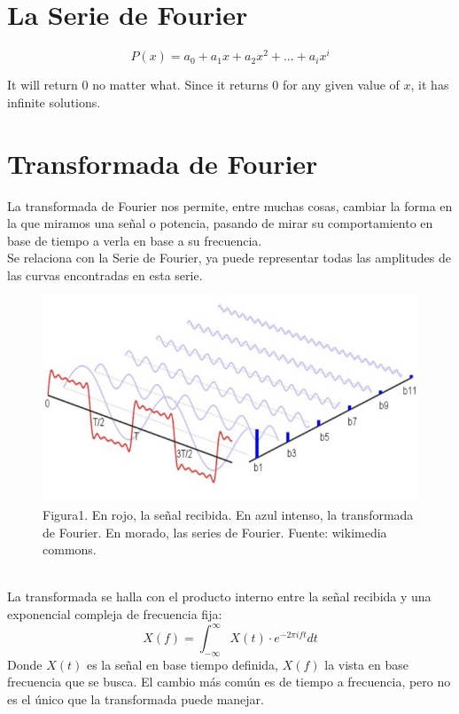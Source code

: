 \documentclass[review,1p]{elsarticle}
\begin{document}

\section{La Serie de Fourier}

\[
    P(x) = a_0 + a_1x + a_2x^2 + ...  + a_ix^i
\]

It will return 0 no matter what. Since it returns 0 for any given value of $x$, it has infinite solutions.\cite{1137202}
\label{S:1}

\section{Transformada de Fourier}
La transformada de Fourier nos permite, entre muchas cosas, cambiar la forma en 
la que miramos una señal o potencia, pasando de mirar su comportamiento en 
base de tiempo a verla en base a su frecuencia.\\
Se relaciona con la Serie de Fourier, ya puede representar todas las
amplitudes de las curvas encontradas en esta serie.\\
\begin{figure}[h]
    \centering
    \includegraphics[scale=0.5]{Figuras/Serie-transformada.jpg}
    \\
    \small Figura1. En rojo, la señal recibida. En azul intenso, la transformada
    de Fourier. En morado, las series de Fourier. Fuente: wikimedia commons.\\
\end{figure}\\
La transformada se halla con el producto interno entre la señal recibida y una
exponencial compleja de frecuencia fija:\\
\begin{equation}
    X(f) = \int_{- \infty}^{\infty} X(t) \cdot e^{-2\pi ift} dt 
\end{equation}
Donde $X(t)$ es la señal en base tiempo definida, $X(f)$ la vista en base frecuencia
que se busca. El cambio más común es de tiempo a frecuencia, pero no es el único que la 
transformada puede manejar.\\
\end{document}
